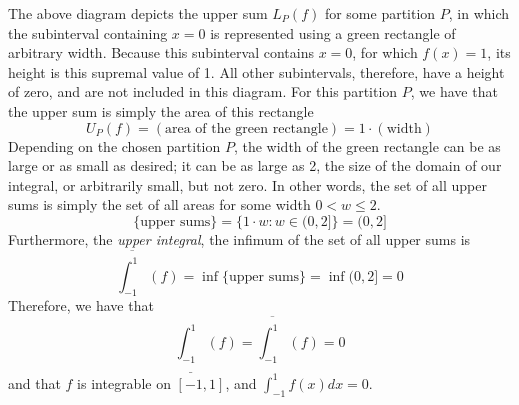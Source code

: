 \documentclass[11pt]{article}
\begin{document}
The above diagram depicts the upper sum $L_P(f)$ for some partition $P$, in which the subinterval containing $x=0$ is represented using a green rectangle of arbitrary width. Because this subinterval contains $x=0$, for which $f(x)=1$, its height is this supremal value of 1. All other subintervals, therefore, have a height of zero, and are not included in this diagram. For this partition $P$, we have that the upper sum is simply the area of this rectangle
$$
    U_P(f)=(\text{area of the green rectangle})=1\cdot(\text{width})
$$
Depending on the chosen partition $P$, the width of the green rectangle can be as large or as small as desired; it can be as large as 2, the size of the domain of our integral, or arbitrarily small, but not zero. In other words, the set of all upper sums is simply the set of all areas for some width $0<w\leq 2$.
$$
    \{\text{upper sums}\}=\{1\cdot w:w\in(0,2]\}=(0,2]
$$
Furthermore, the \textit{upper integral}, the infimum of the set of all upper sums is
$$
    \overline{\int_{-1}^{1}}(f)=\inf\{\text{upper sums}\}=\inf(0,2]=0
$$
Therefore, we have that
$$
    \underline{\int_{-1}^{1}}(f)=\overline{\int_{-1}^{1}}(f)=0
$$
and that $f$ is integrable on $[-1,1]$, and $\displaystyle\int_{-1}^1 f(x)dx=0$.
\end{document}
